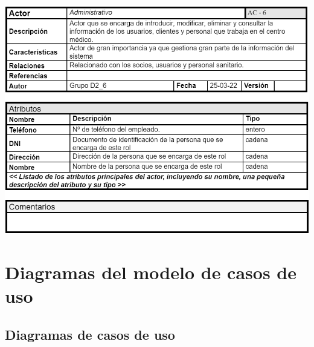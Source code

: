 \documentclass[12pt, spanish]{article}
\begin{document}
\begin{centering}\includegraphics[scale = 0.65]{Actores/Actor7.png}\\[1.0 cm]\end{centering}


\section{Diagramas del modelo de casos de uso}


\subsection{Diagramas de casos de uso}
\end{document}
